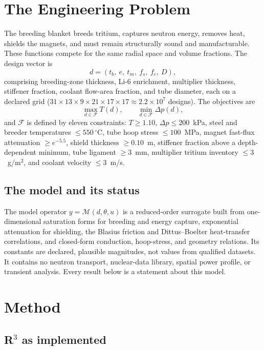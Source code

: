 \documentclass[11pt]{article}
\begin{document}
\section{The Engineering Problem}

The breeding blanket breeds tritium, captures neutron energy, removes heat, shields the
magnets, and must remain structurally sound and manufacturable. These functions compete for
the same radial space and volume fractions. The design vector is
\[
d = (t_b,\ e,\ t_m,\ f_s,\ f_c,\ D),
\]
comprising breeding-zone thickness, Li-6 enrichment, multiplier thickness, stiffener fraction,
coolant flow-area fraction, and tube diameter, each on a declared grid
($31\times13\times9\times21\times17\times17\approx2.2\times10^7$ designs). The objectives are
\[
\max_{d\in\mathcal F} T(d), \qquad \min_{d\in\mathcal F}\Delta p(d),
\]
and $\mathcal F$ is defined by eleven constraints: $T\ge1.10$, $\Delta p\le200$~kPa,
steel and breeder temperatures $\le550\,^\circ$C, tube hoop stress $\le100$~MPa, magnet
fast-flux attenuation $\ge e^{-5.5}$, shield thickness $\ge0.10$~m, stiffener fraction above a
depth-dependent minimum, tube ligament $\ge3$~mm, multiplier tritium inventory $\le3$~g/m$^2$,
and coolant velocity $\le3$~m/s.

\subsection{The model and its status}

The model operator $y=\mathcal M(d,\theta,u)$ is a reduced-order surrogate built from
one-dimensional saturation forms for breeding and energy capture, exponential attenuation for
shielding, the Blasius friction and Dittus--Boelter heat-transfer correlations, and closed-form
conduction, hoop-stress, and geometry relations. Its constants are declared, plausible
magnitudes, not values from qualified datasets. It contains no neutron transport, nuclear-data
library, spatial power profile, or transient analysis. Every result below is a statement about
this model.

\section{Method}

\subsection{R$^3$ as implemented}
\end{document}
